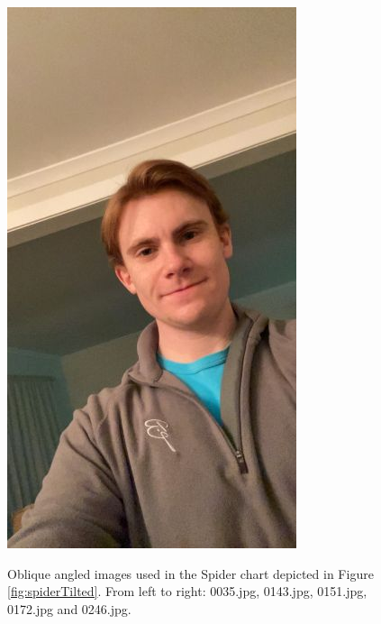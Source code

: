 \begin{figure}[h]
    \subfloat
        {\includegraphics[scale = 0.13]{figures/0246.jpg}\hspace{0.4cm}}
    \caption{Oblique angled images used in the Spider chart depicted in Figure \ref{fig:spiderTilted}. From left to right: 0035.jpg, 0143.jpg, 0151.jpg, 0172.jpg and 0246.jpg.}
    \label{fig:ObliqueA}
\end{figure}

